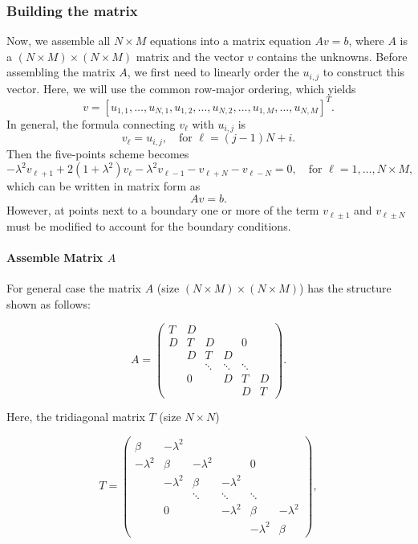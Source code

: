 \documentclass[11pt]{article}
\begin{document}
    \subsubsection{Building the matrix}\label{building-the-matrix}

Now, we assemble all \(N\times M\) equations into a matrix equation
\(A v = b\), where \(A\) is a \((N\times M)\times(N\times M)\) matrix
and the vector \(v\) contains the unknowns. Before assembling the matrix
\(A\), we first need to linearly order the \(u_{i,j}\) to construct this
vector. Here, we will use the common row-major ordering, which yields \[
    v = \left[u_{1,1},\ldots,u_{N,1},u_{1,2},\ldots,u_{N,2},\ldots,u_{1,M},\ldots,u_{N,M}\right]^T.
\] In general, the formula connecting \(v_\ell\) with \(u_{i,j}\) is \[
    v_\ell = u_{i,j},\quad\text{for}\,\,\ell = (j-1)N + i.
\] Then the five-points scheme becomes \[
    -\lambda^2 v_{\ell+1} + 2(1+\lambda^2)v_{\ell} - \lambda^2v_{\ell-1} - v_{\ell+N} - v_{\ell-N} = 0,\quad\text{for}\,\, \ell = 1,\ldots,N\times M,
\] which can be written in matrix form as \[
    A v = b.
\] However, at points next to a boundary one or more of the term
\(v_{\ell\pm1}\) and \(v_{\ell\pm N}\) must be modified to account for
the boundary conditions.

    \paragraph{\texorpdfstring{Assemble Matrix
\(A\)}{Assemble Matrix A}}\label{assemble-matrix-a}

For general case the matrix \(A\) (size
\((N\times M)\times(N\times M)\)) has the structure shown as follows:

\begin{equation*}
    A = \left(\begin{array}{ccccccc}T & D & & & & \\ D & T & D & & 0 & \\ & D & T & D & & \\
                                    & & \ddots & \ddots & \ddots & \\ & 0 & & D & T & D \\ 
                                    & & & & D & T\end{array}\right).
\end{equation*}

Here, the tridiagonal matrix \(T\) (size \(N \times N\))

\begin{equation*}
    T = \left(\begin{array}{ccccccc}\beta & -\lambda^2 & & & & \\ -\lambda^2 & \beta & -\lambda^2 & & 0 & \\ 
                                    & -\lambda^2 & \beta & -\lambda^2 & & \\
                                    & & \ddots & \ddots & \ddots & \\ & 0 & & -\lambda^2 & \beta & -\lambda^2 \\ 
                                    & & & & -\lambda^2 & \beta\end{array}\right),
\end{equation*}
\end{document}
